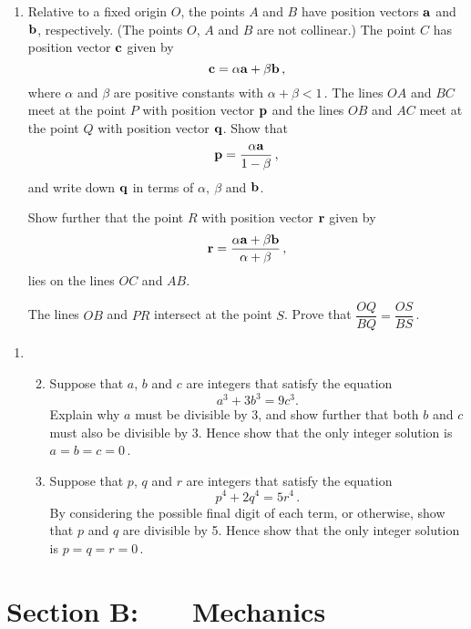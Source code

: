 \documentclass[a4, 11pt]{report}
\newlength{\qspace}
\newcounter{qnumber}
\newenvironment{question}%
 {\vspace{\qspace}
  \begin{enumerate}[\bfseries 1\quad][10]%
    \setcounter{enumi}{\value{qnumber}}%
    \item%
 }
{
  \end{enumerate}
  \filbreak
  \stepcounter{qnumber}
 }
\newenvironment{questionparts}[1][1]%
 {
  \begin{enumerate}[\bfseries (i)]%
    \setcounter{enumii}{#1}
    \addtocounter{enumii}{-1}
    \setlength{\itemsep}{5mm}
    \setlength{\parskip}{8pt}
 }
 {
  \end{enumerate}
 }
\begin{document}
\begin{question}
Relative to a fixed origin 
$O$, the points 
$A$ and $B$ have position vectors 
$\bf{a}$ and $\bf{b}$, respectively. (The points $O$, $A$ and $B$ are not
collinear.) 
The point $C$ has position vector $\bf c$ given by  
\[
{\bf c} =\alpha {\bf a}+ \beta {\bf b}\,,
\] 
where $\alpha$ and $\beta$ are 
positive constants with $\alpha+\beta<1\,$. 
The lines $OA$ 
and $BC$ meet at the point $P$ with position vector $\bf p$
and the lines $OB$ and $AC$ meet at the point $Q$ with position vector $\bf q$. 
Show that 
\[
{\bf p}  =\frac{\alpha {\bf a} }{1-\beta}\,,
\] 
and write down $\bf q$ in terms of 
    $\alpha,\ \beta$ and $\bf   {b}$.


Show  further that the point $R$ 
with position vector $\bf r$ given by 
\[
{\bf r} =\frac{\alpha {\bf a}
+ \beta {\bf b}}{\alpha + \beta}\,,
\] 
 lies on the lines $OC$ and $AB$.

The lines $OB$ and $PR$ intersect at the point $S$.  
Prove that 
$
\dfrac{OQ}{BQ} = \dfrac{OS}{BS}\,$.
\end{question}
		
\begin{question}
\begin{questionparts}
\item Suppose that $a$, $b$ and $c$ are integers 
that satisfy the equation 
\[
a^{3}+3b^{3}=9c^{3}.
\]
Explain why $a$ must be divisible by 3,
and show further that both $b$ and $c$ must also  be divisible by 3. 
Hence show that the only integer solution is $a=b=c=0\,$.

\item Suppose that $p$, $q$ and $r$ are integers
that satisfy the equation
\[
 p^4 +2q^4 = 5r^4  
\,.\]
 By considering the possible final digit of each
term, or otherwise, show that 
$p$ and $q$ are divisible by 5. Hence
show that the only integer solution is $p=q=r=0\,$.

\end{questionparts}
\end{question}	
		

		
	
\newpage
\section*{Section B: \ \ \ Mechanics}
\end{document}
